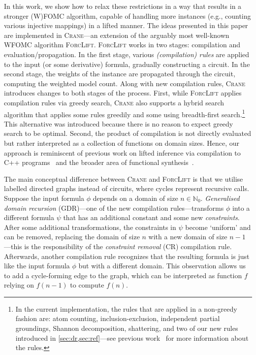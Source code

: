 \documentclass{article}
\theoremstyle{definition}
\theoremstyle{remark}
\begin{document}


In this work, we show how to relax these restrictions in a way that results in a
stronger (W)FOMC algorithm, capable of handling more instances (e.g., counting
various injective mappings) in a lifted manner. The ideas presented in this
paper are implemented in \textsc{Crane}---an extension of the arguably most
well-known WFOMC algorithm \textsc{ForcLift}. \textsc{ForcLift} works in two
stages: compilation and evaluation/propagation. In the first stage, various
\emph{(compilation) rules} are applied to the input (or some derivative)
formula, gradually constructing a circuit. In the second stage, the weights of
the instance are propagated through the circuit, computing the weighted model
count. Along with new compilation rules, \textsc{Crane} introduces changes to
both stages of the process. First, while \textsc{ForcLift} applies compilation
rules via greedy search, \textsc{Crane} also supports a hybrid search algorithm
that applies some rules greedily and some using breadth-first
search.\footnote{In the current implementation, the rules that are applied in a
  non-greedy fashion are: atom counting, inclusion-exclusion, independent
  partial groundings, Shannon decomposition, shattering, and two of our new
  rules introduced in \cref{sec:dr,sec:ref}---see previous
  work~\cite{DBLP:conf/ijcai/BroeckTMDR11} for more information about the
  rules.} This alternative was introduced because there is no reason to expect
greedy search to be optimal. Second, the product of compilation is not directly
evaluated but rather interpreted as a collection of functions on domain sizes.
Hence, our approach is reminiscent of previous work on lifted inference via
compilation to C++ programs~\cite{DBLP:conf/kr/KazemiP16} and the broader area
of functional
synthesis~\cite{DBLP:conf/cav/GoliaRM20,DBLP:conf/pldi/KuncakMPS10,sanathanan1963transfer}.


The main conceptual difference between \textsc{Crane} and \textsc{ForcLift} is
that we utilise labelled directed graphs instead of circuits, where cycles
represent recursive calls. Suppose the input formula $\phi$ depends on a domain
of size $n \in \mathbb{N}_{0}$. \emph{Generalised domain recursion} (GDR)---one
of the new compilation rules---transforms $\phi$ into a different formula $\psi$
that has an additional constant and some new \emph{constraints}. After some
additional transformations, the constraints in $\psi$ become `uniform' and can
be removed, replacing the domain of size $n$ with a new domain of size
$n-1$---this is the responsibility of the \emph{constraint removal} (CR)
compilation rule. Afterwards, another compilation rule recognizes that the
resulting formula is just like the input formula $\phi$ but with a different
domain. This observation allows us to add a cycle-forming edge to the graph,
which can be interpreted as function $f$ relying on $f(n-1)$ to compute $f(n)$.
\end{document}
